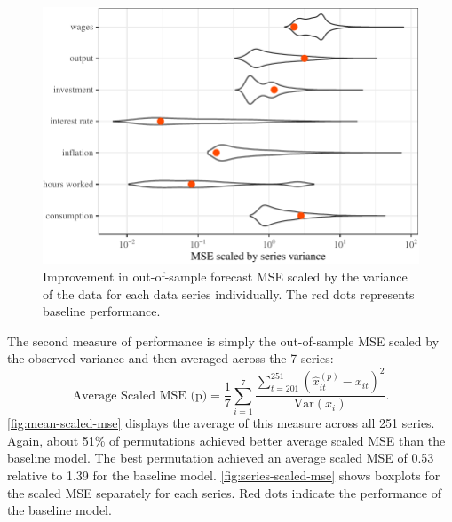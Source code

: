 \documentclass[11pt]{article}
\renewcommand{\hat}{\widehat}
\begin{document}
\begin{figure}[t]

{\centering \includegraphics{gfx/series-scaled-mse-1} 

}

\caption{Improvement in out-of-sample forecast MSE scaled by the variance of the data for each data series individually. The red dots represents baseline performance.}\label{fig:series-scaled-mse}
\end{figure}

The second measure of performance is simply the out-of-sample MSE scaled
by the observed variance and then averaged across the 7 series:
\begin{equation}
  \mbox{Average Scaled MSE (p)} = \frac{1}{7} \sum_{i=1}^7
  \frac{\sum_{t=201}^{251} (\hat{x}_{it}^{(p)}-x_{it})^2}
    {\mbox{Var}(x_i)}.
\end{equation} \autoref{fig:mean-scaled-mse} displays the average of
this measure across all 251 series. Again, about 51\% of permutations
achieved better average scaled MSE than the baseline model. The best
permutation achieved an average scaled MSE of 0.53 relative to 1.39 for
the baseline model. \autoref{fig:series-scaled-mse} shows boxplots for
the scaled MSE separately for each series. Red dots indicate the
performance of the baseline model.
\end{document}
